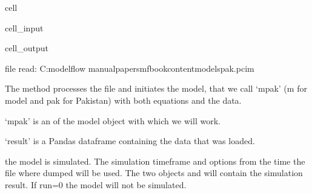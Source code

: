 \documentclass[letterpaper,10pt,english]{jupyterBook}
\begin{document}
\begin{sphinxuseclass}{cell}\begin{sphinxVerbatimInput}

\begin{sphinxuseclass}{cell_input}
\begin{sphinxVerbatim}[commandchars=\\\{\}]
  
\end{sphinxVerbatim}

\end{sphinxuseclass}\end{sphinxVerbatimInput}
\begin{sphinxVerbatimOutput}

\begin{sphinxuseclass}{cell_output}
\begin{sphinxVerbatim}[commandchars=\\\{\}]
file read:  C:\PYGZbs{}modelflow manual\PYGZbs{}papers\PYGZbs{}mfbook\PYGZbs{}content\PYGZbs{}models\PYGZbs{}pak.pcim
\end{sphinxVerbatim}

\end{sphinxuseclass}\end{sphinxVerbatimOutput}

\end{sphinxuseclass}
\sphinxAtStartPar
{} 
The  method processes the file and initiates the model, that we call ‘mpak’ (m for model and pak for Pakistan) with both equations and the data.

\sphinxAtStartPar
‘mpak’ is an   of the  model object with which we will work.

\sphinxAtStartPar
{}  
‘result’ is a Pandas dataframe containing the data that was loaded.

\sphinxAtStartPar
{} the model is simulated. The simulation timeframe  and options from the time the file where dumped will be used. The two objects  and  will contain the simulation result. If run=0 the model will not be simulated.
\end{document}
